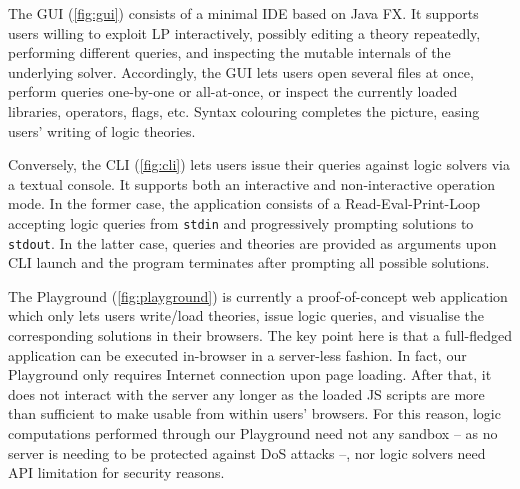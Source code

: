 \documentclass[12pt,a4paper,openright,twoside]{book}
\begin{document}

The \twopkt{} GUI (\cref{fig:gui}) consists of a minimal IDE based on Java FX.
%
It supports users willing to exploit LP interactively, possibly editing a theory repeatedly, performing different queries, and inspecting the mutable internals of the underlying solver.
%
Accordingly, the GUI lets users open several files at once, perform queries one-by-one or all-at-once, or inspect the currently loaded libraries, operators, flags, etc.
%
Syntax colouring completes the picture, easing users' writing of logic theories.


Conversely, the \twopkt{} CLI (\cref{fig:cli}) lets users issue their queries against logic solvers via a textual console.
%
It supports both an interactive and non-interactive operation mode.
%
In the former case, the application consists of a Read-Eval-Print-Loop accepting logic queries from \texttt{stdin} and progressively prompting solutions to \texttt{stdout}.
%
In the latter case, queries and theories are provided as arguments upon CLI launch and the program terminates after prompting all possible solutions.


The \twopkt{} Playground (\cref{fig:playground}) is currently a proof-of-concept web application which only lets users write/load theories, issue logic queries, and visualise the corresponding solutions in their browsers.
%
%
The key point here is that a full-fledged \twopkt{} application can be executed in-browser in a server-less fashion.
%
In fact, our Playground only requires Internet connection upon page loading.
%
After that, it does not interact with the server any longer as the loaded JS scripts are more than sufficient to make \twopkt{} usable from within users' browsers.
%
For this reason, logic computations performed through our Playground need not any sandbox -- as no server is needing to be protected against DoS attacks --, nor logic solvers need API limitation for security reasons.
\end{document}
